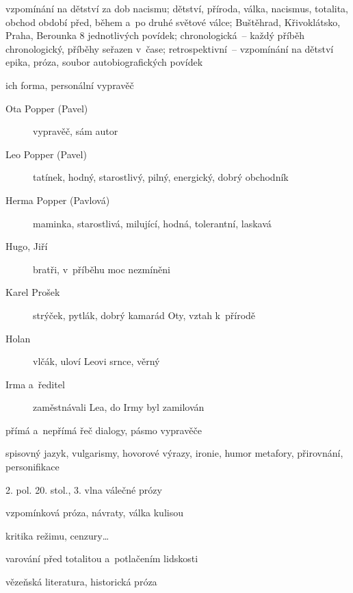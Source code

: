 {
vzpomínání na dětství za dob nacismu; dětství, příroda, válka, nacismus, totalita, obchod
období před, během a~po druhé světové válce; Buštěhrad, Křivoklátsko, Praha, Berounka
8 jednotlivých povídek; chronologická~-- každý příběh chronologický, příběhy
seřazen v~čase; retrospektivní~-- vzpomínání na dětství
epika, próza, soubor autobiografických povídek

\vspace{-10pt}
\newpart
\vspace{-7pt}

ich forma, personální vypravěč
\begin{description}
\item[Ota Popper (Pavel)] vypravěč, sám autor
\item[Leo Popper (Pavel)] tatínek, hodný, starostlivý, pilný, energický, dobrý obchodník
\item[Herma Popper (Pavlová)] maminka, starostlivá, milující, hodná, tolerantní, laskavá
\item[Hugo, Jiří] bratři, v~příběhu moc nezmíněni
\item[Karel Prošek] strýček, pytlák, dobrý kamarád Oty, vztah k~přírodě
\item[Holan] vlčák, uloví Leovi srnce, věrný
\item[Irma a~ředitel] zaměstnávali Lea, do Irmy byl zamilován 
\end{description}

přímá a~nepřímá řeč
dialogy, pásmo vypravěče

\vspace{-10pt}
\newpart
\vspace{-7pt}

spisovný jazyk, vulgarismy, hovorové výrazy, ironie, humor
metafory, přirovnání, personifikace

\begin{compactitem}
	\item 2. pol. 20. stol., 3. vlna válečné prózy
	\item vzpomínková próza, návraty, válka kulisou
	\item kritika režimu, cenzury\dots
	\item varování před totalitou a~potlačením lidskosti
	\item vězeňská literatura, historická próza
\end{compactitem}

}
